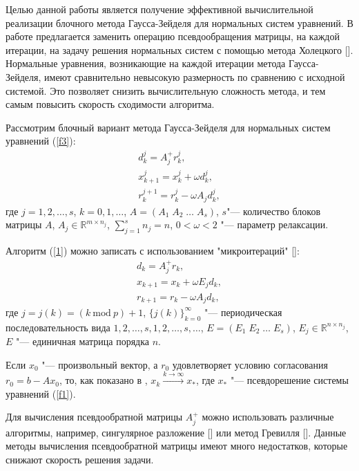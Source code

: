 Целью данной работы является получение эффективной вычислительной реализации блочного метода Гаусса-Зейделя для нормальных систем уравнений.
В работе предлагается заменить операцию псевдообращения матрицы, на каждой итерации, на задачу решения нормальных систем с помощью метода Холецкого []. Нормальные уравнения, возникающие на каждой итерации метода Гаусса-Зейделя, имеют сравнительно невысокую размерность по сравнению с исходной системой. Это позволяет снизить вычислительную сложность метода, и тем самым повысить скорость сходимости алгоритма.

Рассмотрим блочный вариант метода Гаусса-Зейделя для нормальных систем уравнений (\ref{f3}):
\begin{eqnarray}
d^{j}_{k}=A^{+}_{j}r_{k}^{j}, \nonumber \\
x_{k+1}^{j}=x_{k}^{j}+\omega d^{j}_{k}, \label{1} \\
r_{k}^{j+1}=r_{k}^{j}-\omega A_{j}d^{j}_{k},\nonumber
\end{eqnarray}
где $j=1,2,\ldots , s$, $k=0,1,\ldots $, $A=(A_{1} \; A_{2} \; \ldots \; A_{s})$, $s$"--- количество блоков матрицы $A$, $A_{j}\in \mathbb{R}^{m\times n_{j}}$, $\sum \limits_{j=1}^{s}n_{j}=n$, $0< \omega <2$ "--- параметр релаксации.

Алгоритм (\ref{1}) можно записать с использованием "микроитераций" []:
\begin{eqnarray}
d_{k}=A^{+}_{j}r_{k}, \nonumber \\
x_{k+1}=x_{k}+\omega E_{j} d_{k}, \label{2} \\
r_{k+1}=r_{k}-\omega A_{j} d_{k},\nonumber
\end{eqnarray}
где $j=j(k)=(k ~ \mathrm{mod}~ p)+1$,
$\{j(k)\}^{\infty}_{k=0}$
"--- периодическая последовательность вида $1, 2, \ldots, s, 1, 2, \ldots, s, \ldots $,
$E=(E_{1} \; E_{2} \; \ldots \; E_{s})$,
$E_{j}\in \mathbb{R}^{n\times n_{j}}$, $E$
"--- единичная матрица порядка $n$.

Если $x_{0}$
"--- произвольный вектор, а $r_{0}$ удовлетворяет условию согласования $r_{0}=b-Ax_{0}$, то, как показано в \cite{Saad}, $x_{k}\xrightarrow{k\rightarrow\infty}x_{\ast}$, где
$x_{\ast}$ "--- псевдорешение системы уравнений (\ref{f1}).

Для вычисления псевдообратной матрицы $A_{j}^{+}$ можно использовать различные алгоритмы, например, сингулярное разложение [] или метод Гревилля []. Данные методы вычисления псевдообратной матрицы имеют много недостатков, которые снижают скорость решения задачи.

